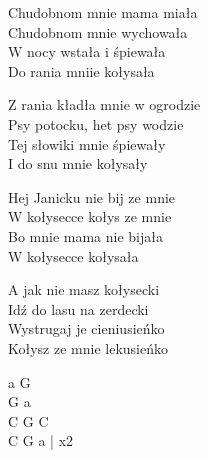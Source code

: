 \begin{text}
    Chudobnom mnie mama miała\\
    Chudobnom mnie wychowała\\
    \vin W nocy wstała i śpiewała\\
    \vin Do rania mniie kołysała 

    Z rania kładła mnie w ogrodzie\\
    Psy potocku, het psy wodzie\\
    \vin Tej słowiki mnie śpiewały\\
    \vin I do snu mnie kołysały

    Hej Janicku nie bij ze mnie\\
    W kołysecce kołys ze mnie\\
    \vin Bo mnie mama nie bijała\\
    \vin W kołysecce kołysała

    A jak nie masz kołysecki\\
    Idź do lasu na zerdecki\\
    \vin Wystrugaj je cieniusieńko\\
    \vin Kołysz ze mnie lekusieńko
\end{text}
\begin{chord}
    a G\\
    G a\\
    C G C\\
    C G a | x2 
\end{chord}
